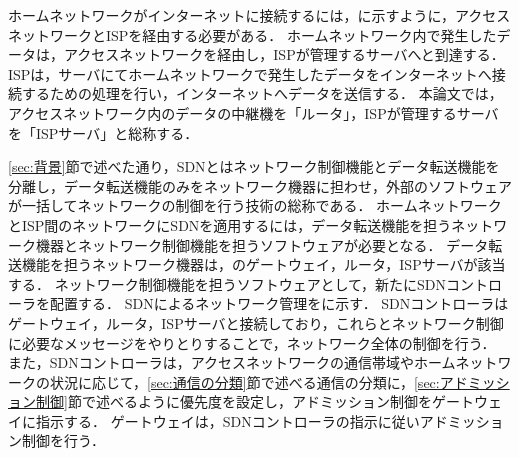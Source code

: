 \documentclass[a4paper,11pt,uplatex]{ujreport}
\begin{document}

  ホームネットワークがインターネットに接続するには，に示すように，アクセスネットワークとISPを経由する必要がある．
  ホームネットワーク内で発生したデータは，アクセスネットワークを経由し，ISPが管理するサーバへと到達する．
  ISPは，サーバにてホームネットワークで発生したデータをインターネットへ接続するための処理を行い，インターネットへデータを送信する．
  本論文では，アクセスネットワーク内のデータの中継機を「ルータ」，ISPが管理するサーバを「ISPサーバ」と総称する．\par


  \ref{sec:背景}節で述べた通り，SDNとはネットワーク制御機能とデータ転送機能を分離し，データ転送機能のみをネットワーク機器に担わせ，外部のソフトウェアが一括してネットワークの制御を行う技術の総称である．
  ホームネットワークとISP間のネットワークにSDNを適用するには，データ転送機能を担うネットワーク機器とネットワーク制御機能を担うソフトウェアが必要となる．
  データ転送機能を担うネットワーク機器は，のゲートウェイ，ルータ，ISPサーバが該当する．
  ネットワーク制御機能を担うソフトウェアとして，新たにSDNコントローラを配置する．
  SDNによるネットワーク管理をに示す．
  SDNコントローラはゲートウェイ，ルータ，ISPサーバと接続しており，これらとネットワーク制御に必要なメッセージをやりとりすることで，ネットワーク全体の制御を行う．
  また，SDNコントローラは，アクセスネットワークの通信帯域やホームネットワークの状況に応じて，\ref{sec:通信の分類}節で述べる通信の分類に，\ref{sec:アドミッション制御}節で述べるように優先度を設定し，アドミッション制御をゲートウェイに指示する．
  ゲートウェイは，SDNコントローラの指示に従いアドミッション制御を行う．\par

  \clearpage

\end{document}
